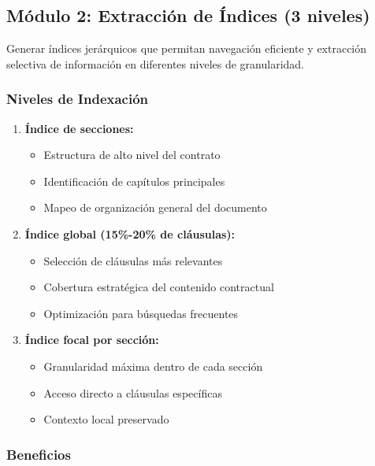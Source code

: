\documentclass[12pt,a4paper]{article}
\begin{document}
\subsection{Módulo 2: Extracción de Índices (3 niveles)}

\begin{tcolorbox}[colback=lightblue!20, colframe=lightblue!80!black, title=Objetivos del Módulo 2]
Generar índices jerárquicos que permitan navegación eficiente y extracción selectiva de información en diferentes niveles de granularidad.
\end{tcolorbox}

\subsubsection{Niveles de Indexación}

\begin{enumerate}[leftmargin=*]
    \item \textbf{Índice de secciones:}
    \begin{itemize}
        \item Estructura de alto nivel del contrato
        \item Identificación de capítulos principales
        \item Mapeo de organización general del documento
    \end{itemize}
    
    \item \textbf{Índice global (15\%-20\% de cláusulas):}
    \begin{itemize}
        \item Selección de cláusulas más relevantes
        \item Cobertura estratégica del contenido contractual
        \item Optimización para búsquedas frecuentes
    \end{itemize}
    
    \item \textbf{Índice focal por sección:}
    \begin{itemize}
        \item Granularidad máxima dentro de cada sección
        \item Acceso directo a cláusulas específicas
        \item Contexto local preservado
    \end{itemize}
\end{enumerate}

\subsubsection{Beneficios}
\end{document}
